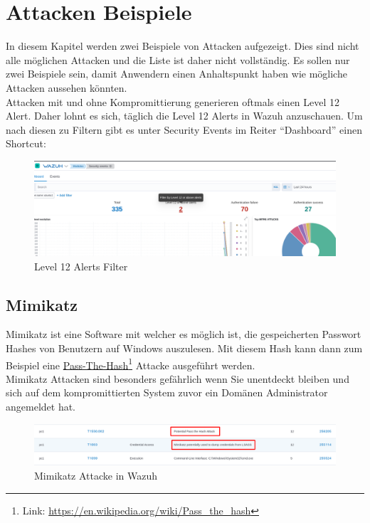 \section{Attacken Beispiele}
In diesem Kapitel werden zwei Beispiele von Attacken aufgezeigt.
Dies sind nicht alle möglichen Attacken und die Liste ist daher nicht vollständig.
Es sollen nur zwei Beispiele sein, damit Anwendern einen Anhaltspunkt haben wie mögliche Attacken aussehen könnten.\\

Attacken mit und ohne Kompromittierung generieren oftmals einen Level 12 Alert. Daher lohnt es sich, täglich die Level 12 Alerts in Wazuh anzuschauen.
Um nach diesen zu Filtern gibt es unter Security Events im Reiter ``Dashboard'' einen Shortcut:
\begin{figure}[H]
    \centering
    \includegraphics[width=\linewidth]{../img/filter-by-level12.png}
    \caption{Level 12 Alerts Filter}
\end{figure}


\subsection{Mimikatz}
Mimikatz ist eine Software mit welcher es möglich ist, die gespeicherten Passwort Hashes von Benutzern auf Windows auszulesen.
Mit diesem Hash kann dann zum Beispiel eine \href{https://en.wikipedia.org/wiki/Pass\_the\_hash}{Pass-The-Hash}\footnote{Link: \href{https://en.wikipedia.org/wiki/Pass\_the\_hash}{https://en.wikipedia.org/wiki/Pass\_the\_hash}} Attacke ausgeführt werden.\\

Mimikatz Attacken sind besonders gefährlich wenn Sie unentdeckt bleiben und sich auf dem kompromittierten System zuvor ein Domänen Administrator angemeldet hat.
\begin{figure}[H]
    \centering
    \includegraphics[width=\linewidth]{../img/mimikatz.png}
    \caption{Mimikatz Attacke in Wazuh}
\end{figure}

